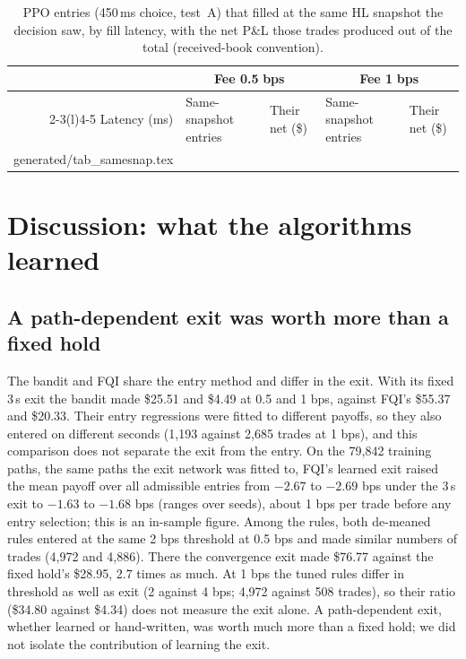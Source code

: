 \documentclass[12pt,a4paper]{article}
\makeatletter
\DeclareRobustCommand{\bps}{\ifmmode\,\text{bps}\else\,bps\fi}
\newcommand{\usd}[1]{\$#1}
\newcommand{\tabinput}[1]{\@@input #1 }
\makeatother
\begin{document}
\begin{table}[!htbp]
\centering
\caption{PPO entries (450\,ms choice, test~A) that filled at the same HL snapshot the decision
saw, by fill latency, with the net P\&L those trades produced out of the total
(received-book convention).}
\label{tab:samesnap}
\small
\begin{tabular}{@{}rllll@{}}
\toprule
 & \multicolumn{2}{c}{Fee 0.5\bps} & \multicolumn{2}{c}{Fee 1\bps} \\
\cmidrule(lr){2-3}\cmidrule(l){4-5}
Latency (ms) & Same-snapshot entries & Their net (\$) & Same-snapshot entries & Their net (\$) \\
\midrule
\tabinput{generated/tab_samesnap.tex}
\bottomrule
\end{tabular}
\end{table}

\section{Discussion: what the algorithms learned}\label{sec:discussion}

\subsection{A path-dependent exit was worth more than a fixed hold}\label{sec:exitvalue}
The bandit and FQI share the entry method and differ in the exit. With its fixed 3\,s exit
the bandit made \usd{25.51} and \usd{4.49} at 0.5 and 1\bps, against FQI's \usd{55.37} and
\usd{20.33}. Their entry regressions were fitted to different payoffs, so they also entered on
different seconds (1,193 against 2,685 trades at 1\bps), and this comparison does not separate
the exit from the entry. On the 79,842 training paths, the same paths the exit network was
fitted to, FQI's learned exit raised the mean payoff over all admissible entries from $-2.67$
to $-2.69$\bps{} under the 3\,s exit to $-1.63$ to $-1.68$\bps{} (ranges over seeds), about
1\bps{} per trade before any entry selection; this is an in-sample figure. Among the rules,
both de-meaned rules entered at the same 2\bps{} threshold at 0.5\bps{} and made similar
numbers of trades (4,972 and 4,886). There the convergence exit made \usd{76.77} against the
fixed hold's \usd{28.95}, 2.7 times as much. At 1\bps{} the tuned rules differ in threshold as
well as exit (2 against 4\bps; 4,972 against 508 trades), so their ratio (\usd{34.80} against
\usd{4.34}) does not measure the exit alone. A path-dependent exit, whether learned or
hand-written, was worth much more than a fixed hold; we did not isolate the contribution of
learning the exit.
\end{document}

